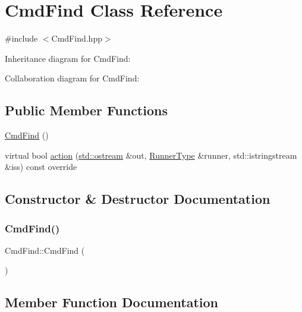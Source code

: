 \hypertarget{classCmdFind}{}\section{Cmd\+Find Class Reference}
\label{classCmdFind}


{\ttfamily \#include $<$Cmd\+Find.\+hpp$>$}



Inheritance diagram for Cmd\+Find\+:


Collaboration diagram for Cmd\+Find\+:
\subsection*{Public Member Functions}
\begin{DoxyCompactItemize}
\item 
\hyperlink{classCmdFind_aa13a72495b6e4d97213abe69541a9d0c}{Cmd\+Find} ()
\item 
virtual bool \hyperlink{classCmdFind_a113977b5959b9d2014a3a47b3f42340e}{action} (\hyperlink{doctest_8h_a116af65cb5e924b33ad9d9ecd7a783f3}{std\+::ostream} \&out, \hyperlink{Command_8hpp_ad45c3de597c2023a8be0399d914161f4}{Runner\+Type} \&runner, std\+::istringstream \&iss) const override
\end{DoxyCompactItemize}


\subsection{Constructor \& Destructor Documentation}
\mbox{\label{classCmdFind_aa13a72495b6e4d97213abe69541a9d0c}} 
\subsubsection{\texorpdfstring{Cmd\+Find()}{CmdFind()}}
{\footnotesize\ttfamily Cmd\+Find\+::\+Cmd\+Find (\begin{DoxyParamCaption}{ }\end{DoxyParamCaption})}



\subsection{Member Function Documentation}
\mbox{\label{classCmdFind_a113977b5959b9d2014a3a47b3f42340e}} 
